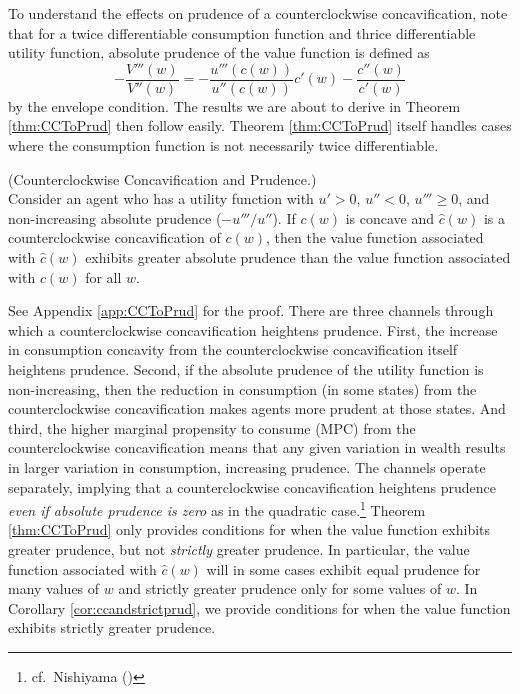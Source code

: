 To understand the effects on prudence of a counterclockwise concavification, note that for a twice differentiable consumption function and thrice differentiable utility function, absolute prudence of the value function is defined as
\begin{equation} -\frac{V'''(w)}{V''(w)} = - \frac{u'''(c(w))}{u''(c(w))}c'(w) - \frac{c''(w)}{c'(w)} \label{eq:prudence}\end{equation}
by the envelope condition. The results we are about to derive in Theorem \ref{thm:CCToPrud} then follow easily. Theorem \ref{thm:CCToPrud} itself handles cases where the consumption function is not necessarily twice differentiable.
\begin{theorem}\label{thm:CCToPrud}  (Counterclockwise Concavification and Prudence.) \\
	Consider an agent who has a utility function %
	with $u' > 0$, $u'' < 0$, $u''' \geq 0$, and non-increasing absolute prudence ($-u'''/u''$). If $c(w)$ is concave and $\hat{c}(w)$ is a counterclockwise concavification of $c(w)$, then the value function associated with $\hat{c}(w)$ exhibits greater absolute prudence than the value function associated with $c(w)$ for all $w$.
\end{theorem}
\noindent See Appendix \ref{app:CCToPrud} for the proof.
There are three channels through which a counterclockwise concavification heightens prudence. First, the increase in consumption concavity from the counterclockwise concavification itself heightens prudence. Second, if the absolute prudence of the utility function is non-increasing, then the reduction in consumption (in some states) from the counterclockwise concavification makes agents more prudent at those states. And third, the higher marginal propensity to consume (MPC) from the counterclockwise concavification means that any given variation in wealth results in larger variation in consumption, increasing prudence. The channels operate separately, implying that a counterclockwise concavification heightens prudence \textit{even if absolute prudence is zero} as in the quadratic case.\footnote{cf.\ Nishiyama (\citeyear{nishiyama2012concavity})}
Theorem \ref{thm:CCToPrud} only provides conditions for when the value function exhibits greater prudence, but not \textit{strictly} greater prudence. In particular, the value function associated with $\hat{c}(w)$ will in some cases exhibit equal prudence for many values of $w$ and strictly greater prudence only for some values of $w$. In Corollary \ref{cor:ccandstrictprud}, we provide conditions for when the value function exhibits strictly greater prudence.
